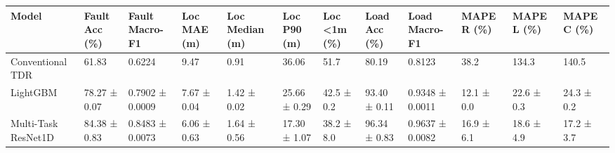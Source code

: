 \begin{tabular}{llllllllllll}
\toprule
Model & Fault Acc (\%) & Fault Macro-F1 & Loc MAE (m) & Loc Median (m) & Loc P90 (m) & Loc <1m (\%) & Load Acc (\%) & Load Macro-F1 & MAPE R (\%) & MAPE L (\%) & MAPE C (\%) \\
\midrule
Conventional TDR & 61.83 & 0.6224 & 9.47 & 0.91 & 36.06 & 51.7 & 80.19 & 0.8123 & 38.2 & 134.3 & 140.5 \\
LightGBM & 78.27 ± 0.07 & 0.7902 ± 0.0009 & 7.67 ± 0.04 & 1.42 ± 0.02 & 25.66 ± 0.29 & 42.5 ± 0.2 & 93.40 ± 0.11 & 0.9348 ± 0.0011 & 12.1 ± 0.0 & 22.6 ± 0.3 & 24.3 ± 0.2 \\
Multi-Task ResNet1D & 84.38 ± 0.83 & 0.8483 ± 0.0073 & 6.06 ± 0.63 & 1.64 ± 0.56 & 17.30 ± 1.07 & 38.2 ± 8.0 & 96.34 ± 0.83 & 0.9637 ± 0.0082 & 16.9 ± 6.1 & 18.6 ± 4.9 & 17.2 ± 3.7 \\
\bottomrule
\end{tabular}
